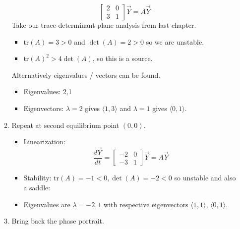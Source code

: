 \documentclass{article}
\begin{document}
\begin{enumerate}
\begin{enumerate}
\[\begin{bmatrix}
2  & 0  \\
3  & 1
\end{bmatrix} \vec{Y} = A\vec{Y}
\]
Take our trace-determinant plane analysis from last chapter.
\begin{itemize}
\item $\text{tr}(A) = 3>0$ and $\det(A)=2>0$ so we are unstable.
\item $\text{tr}(A)^2 > 4\det(A)$, so this is a source.
\end{itemize}
Alternatively eigenvalues / vectors can be found.
\begin{itemize}
\item Eigenvalues: 2,1
\item Eigenvectors: $\lambda = 2$ gives $\langle 1,3 \rangle$ and $\lambda = 1$ gives $\langle 0,1 \rangle$.
\end{itemize}
\item Repeat at second equilibrium point $(0,0)$. 
\begin{itemize}
\item Linearization:
\[
\frac{d\vec{Y}}{dt} = \begin{bmatrix}
-2  & 0  \\
-3  & 1
\end{bmatrix} \vec{Y} = A\vec{Y}
\]
\item Stability: $\text{tr}(A) = -1<0, \det(A)=-2<0$ so unstable and also a saddle:
\item Eigenvalues are $\lambda =-2,1$ with respective eigenvectors $\langle 1,1 \rangle$, $\langle 0,1 \rangle$.
\end{itemize}
\item Bring back the phase portrait.
\end{enumerate}


\end{enumerate}
\end{document}
